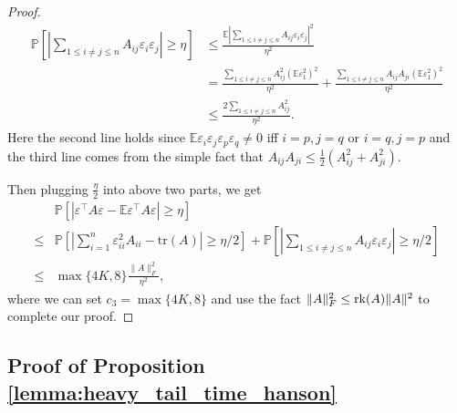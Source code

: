 \begin{proof}
\begin{equation*}
\begin{aligned}
\mathbb{P}\left[\left|\sum_{1 \le  i\neq j \le n} A_{ij}\varepsilon_i\varepsilon_j \right|\ge \eta\right] &\le \frac{\mathbb{E}\left|\sum_{1 \le  i\neq j \le n} A_{ij}\varepsilon_i\varepsilon_j \right|^2}{\eta^2} \\
& = \frac{\sum_{1\le i \neq j\le n} A^2_{ij}(\mathbb{E}\varepsilon^2_1)^2}{\eta^2} +\frac{\sum_{1\le i\neq j\le n}A_{ij}A_{ji}(\mathbb{E}\varepsilon^2_1)^2}{\eta^2}\\
&\le  \frac{2\sum_{1\le i\neq j\le n} A^2_{ij}}{\eta^2}.
\end{aligned}
\end{equation*}
Here the second line holds since  $\mathbb{E}\varepsilon_i\varepsilon_j\varepsilon_p\varepsilon_q\neq 0$ iff $i=p,j=q$ or $i=q, j=p$ and the third line comes from the simple fact that 
$A_{ij}A_{ji}\le \frac{1}{2}(A^2_{ij}+A^2_{ji})$. \par 
Then plugging $\frac{\eta}{2}$ into above two parts, we get \begin{equation*}
\begin{aligned}
    &\mathbb{P}\left[|\varepsilon^\top A\varepsilon - \mathbb{E} \varepsilon^\top A\varepsilon|\ge \eta\right] \\
    \leq& \mathbb{P}\left[\left|\sum_{i=1}^n \varepsilon ^2_{ii} A_{ii} - \text{tr}(A)\right|\ge \eta/2\right]+\mathbb{P}\left[\left|\sum_{1\le i \neq j\le n} A_{ij}\varepsilon_i\varepsilon_j \right|\ge \eta/2\right]\\
    \leq& \max\{4K,8\} \frac{\|A\|_F^2}{\eta^2},
\end{aligned}
\end{equation*}
where we can set $c_3=\max\{4K,8\}$ and use the fact $\|A\|^2_F\le \mbox{rk}(A)\|A\|^2$ to complete our proof. 
\end{proof}
\subsection{Proof of Proposition \ref{lemma:heavy_tail_time_hanson}} %

